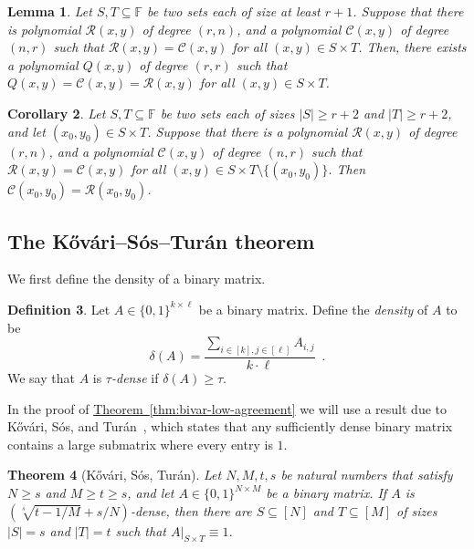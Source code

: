 \documentclass[11pt]{article}
\numberwithin{equation}{section}
\newtheorem{theorem}{Theorem}[section]
\newtheorem{lemma}[theorem]{Lemma}
\newtheorem{corollary}[theorem]{Corollary}
\theoremstyle{definition}
\newtheorem{definition}[theorem]{Definition}
\theoremstyle{plain}
\newcommand{\expref}[2]{\hyperref[#2]{#1~\ref{#2}}}
\theoremstyle{plain}
\newcommand{\colored}{}
\newcommand{\blocklength}{\colored{n}} %
\newcommand{\Field}{\colored{\mathbb F}}
\newcommand{\degree}{\colored{r}}
\newcommand{\rowpoly}{\colored{\mathcal R}}
\newcommand{\colpoly}{\colored{\mathcal C}}
\newcommand\abs[1]{\colored{\left|#1\right|}}
\begin{document}
\begin{lemma}\label{lemma:interpolation}
    Let $S,T \subseteq \Field$ be two sets each of size at least $\degree+1$.
    Suppose that there is polynomial $\rowpoly(x,y)$ of degree $(\degree, \blocklength)$,
    and a polynomial $\colpoly(x,y)$ of degree $(\blocklength,\degree)$ such that
    $\rowpoly(x,y) = \colpoly(x,y)$ for all $(x,y) \in S \times T$.
    Then, there exists a polynomial $Q(x,y)$ of degree $(\degree,\degree)$
    such that $Q(x,y) = \colpoly(x,y) = \rowpoly(x,y)$ for all $(x,y) \in S \times T$.
\end{lemma}

\begin{corollary}\label{cor:completing boxes}
    Let $S,T \subseteq \Field$ be two sets each of sizes $\abs{S} \geq \degree+2$ and $\abs{T} \geq \degree+2$,
    and let $(x_0,y_0) \in S \times T$.
    Suppose that there is a polynomial $\rowpoly(x,y)$ of degree $(\degree,\blocklength)$,
    and a polynomial $\colpoly(x,y)$ of degree $(\blocklength,\degree)$ such that
    $\rowpoly(x,y) = \colpoly(x,y)$ for all $(x,y) \in S \times T \setminus \{(x_0,y_0)\}$.
    Then $\colpoly(x_0,y_0) = \rowpoly(x_0,y_0)$.
\end{corollary}

%
\subsection{The \texorpdfstring{K\H{o}v\'{a}ri}{Kovari}--S\'{o}s--Tur\'{a}n theorem} %

We first define the density of a binary matrix.
\begin{definition}
    Let $A \in \{0,1\}^{k \times \ell}$ be a binary matrix.
    Define the \emph{density} of $A$ to be
    \[
      \delta(A) = \frac{\sum_{i \in [k], j \in [\ell]} A_{i,j}}{k \cdot \ell}\enspace.
    \]
    We say that $A$ is \emph{$\tau$-dense} if $\delta(A) \geq \tau$.
\end{definition}

In the proof of \expref{Theorem}{thm:bivar-low-agreement}
we will use a result due to
%
K\H{o}v\'{a}ri,     %
S\'{o}s, and Tur\'{a}n~\cite{KovariST54},
which states that any sufficiently dense binary matrix contains a large
submatrix where every entry is $1$.

%
\begin{theorem}[K\H{o}v\'{a}ri, S\'{o}s, Tur\'{a}n]\label{thm:KST}  %
Let $N, M, t, s$ be natural numbers that satisfy $N \ge s$ and $M \ge t \ge s$,
and let $A \in \{0,1\}^{N \times M}$ be a binary matrix.
If $A$ is $(\sqrt[s]{{t-1}/{M}} + {s}/{N})$-dense, then
there are $S \subseteq [N]$ and $T \subseteq [M]$ of sizes $\abs{S} = s$ and $\abs{T}=t$
such that $A \vert_{S \times T} \equiv 1$.
\end{theorem}
\end{document}
